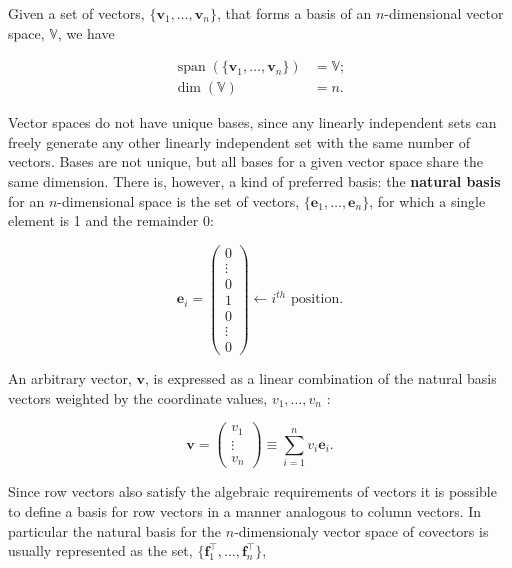 \documentclass[12pt, twoside, draft]{article}
\begin{document}
Given a set of vectors, $\{\mathbf{v}_1, \ldots, \mathbf{v}_n\}$, that forms a basis of an $n$-dimensional vector space, $\mathbb{V}$, we have


\begin{align}\label{eq:span_dim}
\operatorname{span} (\{\mathbf{v}_1, \ldots, \mathbf{v}_n\}) &= \mathbb{V}; \\
\dim (\mathbb{V}) &= n.
\end{align}

Vector spaces do not have unique bases, since any linearly independent sets can freely generate any other linearly independent set with the same number of vectors.  Bases are not unique, but all bases for a given vector space share the same dimension.  There is, however, a kind of preferred basis: the \textbf{natural basis} for an $n$-dimensional space is the set of vectors, $\{\mathbf{e}_1, \ldots, \mathbf{e}_n\}$, for which a single element is 1 and the remainder 0:

\begin{equation}\label{eq:natural_basis_vectors}
\mathbf{e}_i = \begin{pmatrix} 0 \\ \vdots \\ 0 \\ 1 \\ 0 \\ \vdots \\ 0 \end{pmatrix} \leftarrow i^{th} \text{ position.}  
\end{equation}

An arbitrary vector, $\mathbf{v}$, is expressed as a linear combination of the natural basis vectors weighted by the coordinate values, $v_1, \ldots, v_n$ :

\begin{equation}\label{eq:natural_basis_expansions}
\mathbf{v} = \begin{pmatrix} v_1 \\ \vdots \\ v_n \end{pmatrix} \equiv \sum_{i=1}^n v_i \mathbf{e}_i .
\end{equation}

Since row vectors also satisfy the algebraic requirements of vectors it is possible to define a basis for row vectors in a manner analogous to column vectors.  In particular the natural basis for the $n$-dimensionaly vector space of covectors is usually represented as the set, $\{\mathbf{f}_1^\top, \ldots, \mathbf{f}_n^\top \}$,
\end{document}
